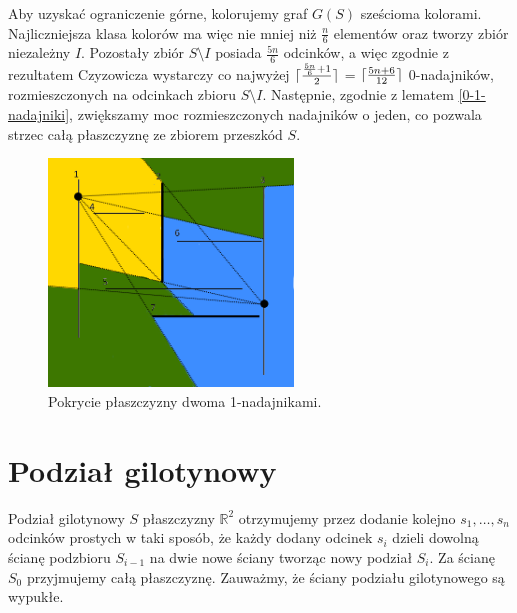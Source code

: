 \documentclass[brudnopis]{xmgr}
\DeclarePairedDelimiter\ceil{\lceil}{\rceil}
\theoremstyle{definition}
\begin{document}
\indent Aby uzyskać ograniczenie górne, kolorujemy graf $G(S)$ sześcioma kolorami. Najliczniejsza klasa kolorów ma więc nie mniej niż $\frac{n}{6}$ elementów oraz tworzy zbiór niezależny $I$. Pozostały zbiór $S \setminus I$ posiada $\frac{5n}{6}$ odcinków, a więc zgodnie z rezultatem Czyzowicza wystarczy co najwyżej $\ceil{\frac{\frac{5n}{6} + 1}{2}}$ = $\ceil{\frac{5n+6}{12}}$ 0-nadajników, rozmieszczonych na odcinkach zbioru $S \setminus I$. Następnie, zgodnie z lematem \ref{0-1-nadajniki}, zwiększamy moc rozmieszczonych nadajników o jeden, co pozwala strzec całą płaszczyznę ze zbiorem przeszkód $S$.
\begin{figure}[ht!]
  \centering
  \includegraphics[width=6.5cm]{rysunki/pokrycie_nadajnikami.png}
  \caption{Pokrycie płaszczyzny dwoma 1-nadajnikami.}
  \label{fig:pokrycie plaszczyzny}
\end{figure} 

\section{Podział gilotynowy}
Podział gilotynowy $S$ płaszczyzny $\mathbb{R}^2$ otrzymujemy przez dodanie kolejno $s_1,\ldots,s_n$ odcinków prostych w taki sposób, że każdy dodany odcinek $s_i$ dzieli dowolną ścianę podzbioru $S_{i-1}$ na dwie nowe ściany tworząc nowy podział $S_i$. Za ścianę $S_0$ przyjmujemy całą płaszczyznę. Zauważmy, że ściany podziału gilotynowego są wypukłe.
\end{document}
